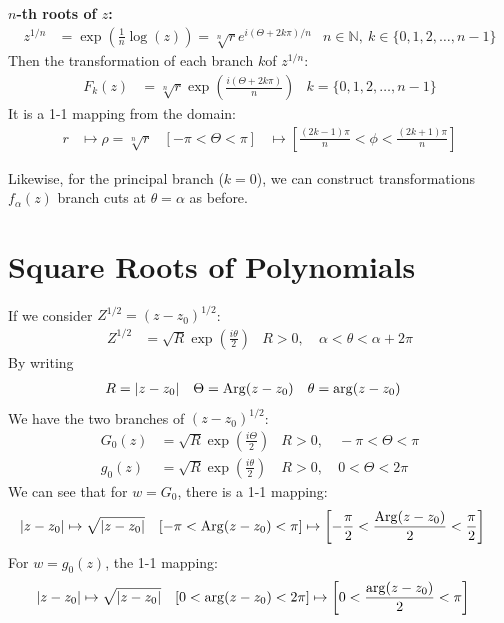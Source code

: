 \documentclass[12pt, english]{book}
\DeclareMathOperator\Arg{Arg}
\begin{document}
	\textbf{\(n\)-th roots of \(z\):}\newline
	\begin{align*}
		z^{1/n} &= \exp(\frac{1}{n} \log(z)) = \sqrt[n]{r} e^{i(\Theta + 2k\pi)/n}
			& n \in \mathbb{N}, \ k \in \{0, 1, 2, \ldots, n-1\}
	\end{align*}
	Then the transformation of each branch \(k\)of \(z^{1/n}\):
	\begin{align*}
		F_k(z) &= \sqrt[n]{r} \exp(\frac{i(\Theta + 2k\pi)}{n})
			& k= \{0, 1, 2, \ldots, n-1\}
	\end{align*}
	It is a 1-1 mapping from the domain:
	\begin{align*}
		r &\mapsto \rho = \sqrt[n]{r} &
		\left[-\pi < \Theta < \pi\right] &\mapsto \left[\frac{(2k-1)\pi}{n} < \phi < \frac{(2k+1)\pi}{n}\right]
	\end{align*}
	
	Likewise, for the principal branch (\(k=0\)), we can construct transformations \(f_\alpha(z)\) branch cuts at \(\theta = \alpha\) as before.
	
	\section{Square Roots of Polynomials} \label{Square Roots of Polynomials Section - Complex}
	
	\begin{example}
		If we consider \(Z^{1/2} = (z - z_0)^{1/2}\):
		\begin{align*}
			Z^{1/2} &= \sqrt{R} \exp(\frac{i\theta}{2})
				& R>0, &\ \alpha < \theta < \alpha + 2\pi
		\end{align*}
		By writing 
		\begin{align*}
			R &= \abs{z-z_0} &
			\Theta &= \Arg(z - z_0) &
			\theta &= \arg(z-z_0)
		\end{align*}
		We have the two branches of \((z-z_0)^{1/2}\):
		\begin{align*}
			G_0(z) &= \sqrt{R} \exp(\frac{i\Theta}{2})	&
				R>0, &\ -\pi < \Theta < \pi \\
			g_0(z) &= \sqrt{R} \exp(\frac{i\theta}{2})	&
				R>0, &\ 0 < \Theta < 2\pi
		\end{align*}
		We can see that for \(w = G_0\), there is a 1-1 mapping:
		\begin{align*}
			\abs{z-z_0} &\mapsto \sqrt{\abs{z-z_0}}
				& \left[-\pi < \Arg(z-z_0) < \pi \right] &\mapsto
					\left[-\frac{\pi}{2} < \frac{\Arg(z-z_0)}{2} < \frac{\pi}{2}\right]
		\end{align*}
		For \(w = g_0(z)\), the 1-1 mapping:
		\begin{align*}
			\abs{z-z_0} &\mapsto \sqrt{\abs{z-z_0}}
				& \left[0 < \arg(z-z_0) < 2\pi \right] &\mapsto
					\left[0 < \frac{\arg(z-z_0)}{2} < \pi \right]
		\end{align*}
	\end{example}
\end{document}
